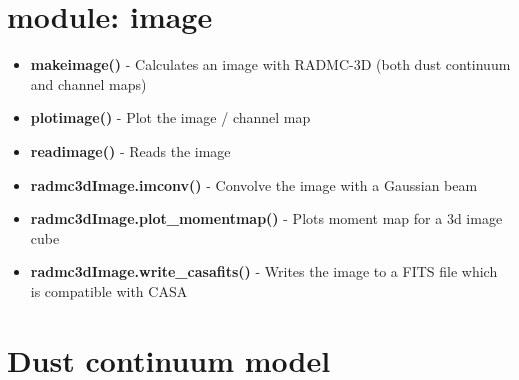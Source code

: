 \documentclass[12pt]{article}
\begin{document}
\section*{module: image}
\begin{itemize}
\item[]{\bf makeimage()} - Calculates an image with RADMC-3D (both dust continuum and channel maps)
\item[]{\bf plotimage()} - Plot the image / channel map
\item[]{\bf readimage()} - Reads the image
\item[]{\bf radmc3dImage.imconv()} - Convolve the image with a Gaussian beam 
\item[]{\bf radmc3dImage.plot\_momentmap()} - Plots moment map for a 3d image cube
\item[]{\bf radmc3dImage.write\_casafits()} - Writes the image to a FITS file which is compatible with CASA
\end{itemize}

\newpage
\section*{Dust continuum model} 
\end{document}
